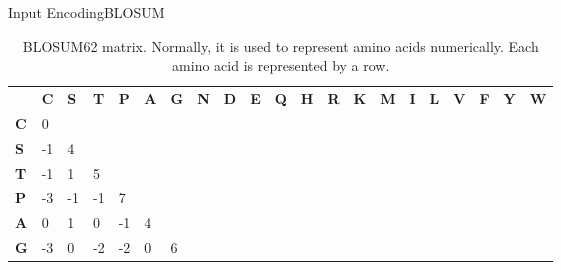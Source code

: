 \documentclass[10pt]{beamer}
\newcommand{\1}{
	\setbeamertemplate{background}{
		\texttt{[image: ../img/1]}
		\tikz[overlay] \fill[fill opacity=0.75,fill=white] (0,0) rectangle (-\paperwidth,\paperheight);
	}
}
\begin{document}
	
	\begin{frame}{Input Encoding}{BLOSUM}	
		\begin{table}[]
			\tiny
			\centering
			\caption{BLOSUM62 matrix. Normally, it is used to represent amino acids numerically. Each amino acid is represented by a row.}
			\label{tab:blosum62}
			\setlength{\tabcolsep}{0.5em} %
			{\renewcommand{\arraystretch}{1.2}%
				
				
				\begin{tabular}{lllllllllllllllllllll}
					& \textbf{C} & \textbf{S} & \textbf{T} & \textbf{P} & \textbf{A} & \textbf{G} & \textbf{N} & \textbf{D} & \textbf{E} & \textbf{Q} & \textbf{H} & \textbf{R} & \textbf{K} & \textbf{M} & \textbf{I} & \textbf{L} & \textbf{V} & \textbf{F} & \textbf{Y} & \textbf{W} \\
					\textbf{C} & 0          &            &            &            &            &            &            &            &            &            &            &            &            &            &            &            &            &            &            &            \\
					\textbf{S} & -1         & 4          &            &            &            &            &            &            &            &            &            &            &            &            &            &            &            &            &            &            \\
					\textbf{T} & -1         & 1          & 5          &            &            &            &            &            &            &            &            &            &            &            &            &            &            &            &            &            \\
					\textbf{P} & -3         & -1         & -1         & 7          &            &            &            &            &            &            &            &            &            &            &            &            &            &            &            &            \\
					\textbf{A} & 0          & 1          & 0          & -1         & 4          &            &            &            &            &            &            &            &            &            &            &            &            &            &            &            \\
					\textbf{G} & -3         & 0          & -2         & -2         & 0          & 6          &            &            &            &            &            &            &            &            &            &            &            &            &            &            \\

\end{tabular}}
\end{table}
\end{frame}
\end{document}
